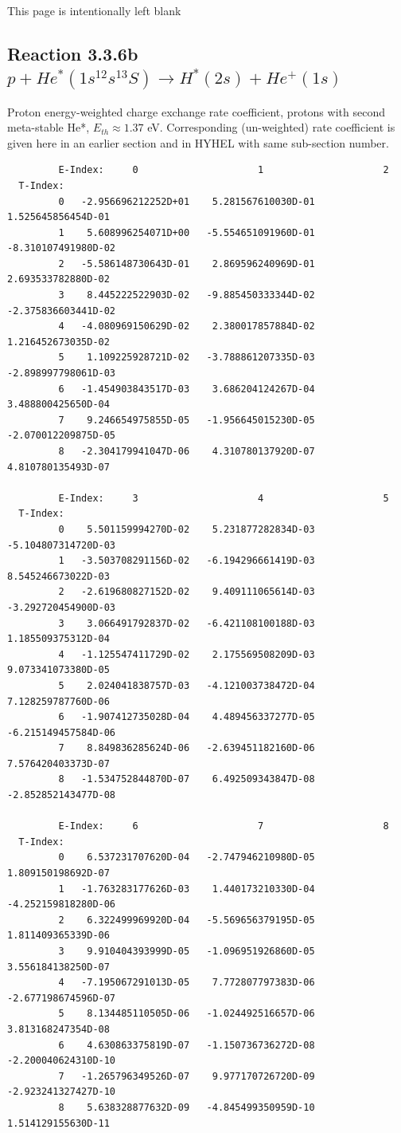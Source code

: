 \documentclass[12pt,dvipdfmx]{article}
\begin{document}
\newpage
This page is intentionally left blank
\newpage

\subsection{
Reaction 3.3.6b  $  p + He^*(1s^12s^13S) \rightarrow H^*(2s) + He^+(1s)$
}
Proton energy-weighted charge exchange rate coefficient,
protons with second meta-stable He*, $E_{th} \approx 1.37$ eV.
Corresponding (un-weighted) rate coefficient is given here in an earlier section and in HYHEL with same sub-section number.

\begin{small}\begin{verbatim}
         E-Index:     0                     1                     2
  T-Index:
         0   -2.956696212252D+01    5.281567610030D-01    1.525645856454D-01
         1    5.608996254071D+00   -5.554651091960D-01   -8.310107491980D-02
         2   -5.586148730643D-01    2.869596240969D-01    2.693533782880D-02
         3    8.445222522903D-02   -9.885450333344D-02   -2.375836603441D-02
         4   -4.080969150629D-02    2.380017857884D-02    1.216452673035D-02
         5    1.109225928721D-02   -3.788861207335D-03   -2.898997798061D-03
         6   -1.454903843517D-03    3.686204124267D-04    3.488800425650D-04
         7    9.246654975855D-05   -1.956645015230D-05   -2.070012209875D-05
         8   -2.304179941047D-06    4.310780137920D-07    4.810780135493D-07

         E-Index:     3                     4                     5
  T-Index:
         0    5.501159994270D-02    5.231877282834D-03   -5.104807314720D-03
         1   -3.503708291156D-02   -6.194296661419D-03    8.545246673022D-03
         2   -2.619680827152D-02    9.409111065614D-03   -3.292720454900D-03
         3    3.066491792837D-02   -6.421108100188D-03    1.185509375312D-04
         4   -1.125547411729D-02    2.175569508209D-03    9.073341073380D-05
         5    2.024041838757D-03   -4.121003738472D-04    7.128259787760D-06
         6   -1.907412735028D-04    4.489456337277D-05   -6.215149457584D-06
         7    8.849836285624D-06   -2.639451182160D-06    7.576420403373D-07
         8   -1.534752844870D-07    6.492509343847D-08   -2.852852143477D-08

         E-Index:     6                     7                     8
  T-Index:
         0    6.537231707620D-04   -2.747946210980D-05    1.809150198692D-07
         1   -1.763283177626D-03    1.440173210330D-04   -4.252159818280D-06
         2    6.322499969920D-04   -5.569656379195D-05    1.811409365339D-06
         3    9.910404393999D-05   -1.096951926860D-05    3.556184138250D-07
         4   -7.195067291013D-05    7.772807797383D-06   -2.677198674596D-07
         5    8.134485110505D-06   -1.024492516657D-06    3.813168247354D-08
         6    4.630863375819D-07   -1.150736736272D-08   -2.200040624310D-10
         7   -1.265796349526D-07    9.977170726720D-09   -2.923241327427D-10
         8    5.638328877632D-09   -4.845499350959D-10    1.514129155630D-11


\end{verbatim}
\end{small}
\end{document}
